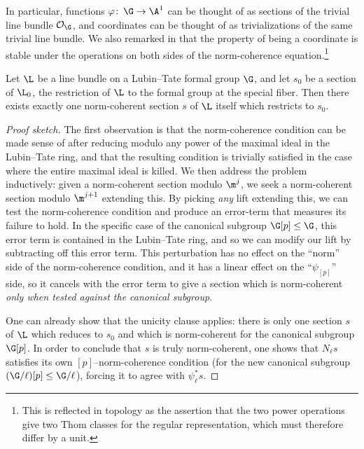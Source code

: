 \begin{example}
In particular, functions \(\phi\co \G \to \A^1\) can be thought of as sections of the trivial line bundle \(\sheaf O_{\G}\), and coordinates can be thought of as trivializations of the same trivial line bundle.  We also remarked in  that the property of being a coordinate is stable under the operations on both sides of the norm-coherence equation.\footnote{This is reflected in topology as the assertion that the two power operations give two Thom classes for the regular representation, which must therefore differ by a unit.}
\end{example}

\begin{theorem}\label{AndosAlgebraicTheorem}
Let \(\L\) be a line bundle on a Lubin--Tate formal group \(\G\), and let \(s_0\) be a section of \(\L_0\), the restriction of \(\L\) to the formal group at the special fiber.  Then there exists exactly one norm-coherent section \(s\) of \(\L\) itself which restricts to \(s_0\).
\end{theorem}
\begin{proof}[Proof sketch]
The first observation is that the norm-coherence condition can be made sense of after reducing modulo any power of the maximal ideal in the Lubin--Tate ring, and that the resulting condition is trivially satisfied in the case where the entire maximal ideal is killed.  We then address the problem inductively: given a norm-coherent section modulo \(\m^j\), we seek a norm-coherent section modulo \(\m^{j+1}\) extending this.  By picking \emph{any} lift extending this, we can test the norm-coherence condition and produce an error-term that measures its failure to hold.  In the specific case of the canonical subgroup \(\G[p] \le \G\), this error term is contained in the Lubin--Tate ring, and so we can modify our lift by subtracting off this error term.  This perturbation has no effect on the ``norm'' side of the norm-coherence condition, and it has a linear effect on the ``\(\psi_{[p]}\)'' side, so it cancels with the error term to give a section which is norm-coherent \emph{only when tested against the canonical subgroup}.

One can already show that the unicity clause applies: there is only one section \(s\) of \(\L\) which reduces to \(s_0\) and which is norm-coherent for the canonical subgroup \(\G[p]\).  In order to conclude that \(s\) is truly norm-coherent, one shows that \(N_\ell s\) satisfies its own \([p]\)--norm-coherence condition (for the new canonical subgroup \((\G / \ell)[p] \le \G / \ell\)), forcing it to agree with \(\psi_\ell^* s\).
\end{proof}

